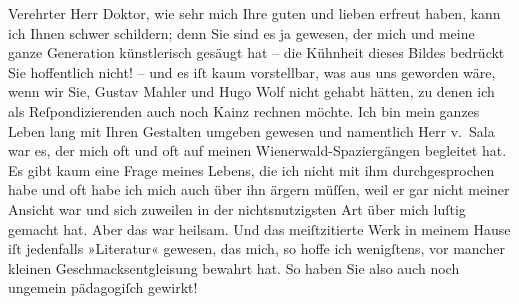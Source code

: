 \pstart{}Verehrter Herr Doktor,\pend\vspace{0.5em}
\pstart
           wie sehr mich Ihre guten und lieben \label{K_L02572-1v}\label{K_L02572-1} erfreut haben, kann ich Ihnen
               schwer schildern; denn Sie sind es ja gewesen, der mich und meine ganze Generation
               künstlerisch gesäugt hat – die Kühnheit dieses Bildes bedrückt Sie hoffentlich nicht!
               – und es iſt kaum vorstellbar, was aus uns geworden wäre, wenn wir Sie, Gustav Mahler und Hugo Wolf nicht gehabt hätten, zu denen ich als
               Reſpondizierenden auch noch Kainz rechnen
               möchte. Ich bin mein ganzes Leben lang \strikeout{\textcolor{gray}{viel}} mit Ihren Gestalten umgeben gewesen und namentlich Herr v. Sala war es, der mich oft und oft
               auf meinen Wienerwald-Spaziergängen begleitet
               hat. Es gibt kaum eine Frage meines Lebens, die ich nicht mit ihm durchgesprochen
               habe und oft habe ich mich auch über ihn ärgern müſſen, weil er gar nicht meiner
               Ansicht war und sich zuweilen in der nichtsnutzigsten Art über mich luſtig gemacht
               hat. Aber das war heilsam. Und das meiſtzitierte Werk in meinem Hause iſt jedenfalls
                  »Literatur« gewesen, das mich, so hoffe ich
               wenigſtens, vor mancher kleinen Geschmacksentgleisung bewahrt hat. So haben Sie also
               auch noch ungemein pädagogiſch gewirkt!\pend
           
